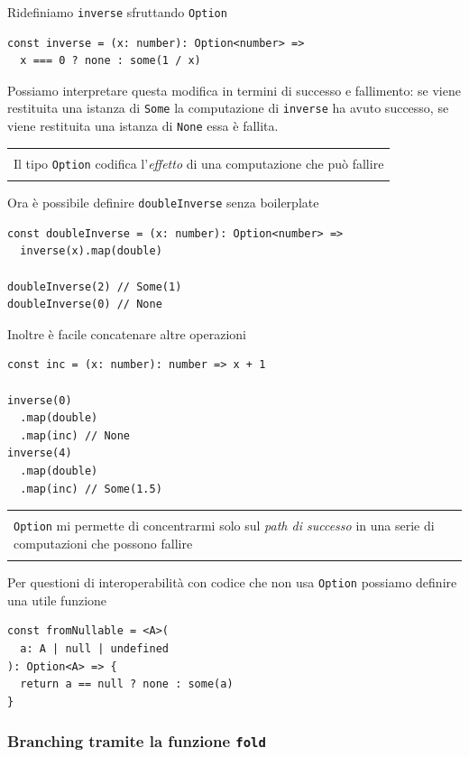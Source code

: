\documentclass[12pt]{article}
\newenvironment{boxed}
    {\begin{center}
    \begin{tabular}{|p{0.9\textwidth}|}
    \hline\\
    }
    {
    \\\\\hline
    \end{tabular}
    \end{center}
    }
\begin{document}
Ridefiniamo \texttt{inverse} sfruttando \texttt{Option}

\begin{verbatim}
const inverse = (x: number): Option<number> =>
  x === 0 ? none : some(1 / x)
\end{verbatim}

Possiamo interpretare questa modifica in termini di successo e fallimento: se viene restituita una istanza di \texttt{Some}
la computazione di \texttt{inverse} ha avuto successo, se viene restituita una istanza di \texttt{None} essa è fallita.

\begin{boxed}
Il tipo \texttt{Option} codifica l'\emph{effetto} di una computazione che può fallire
\end{boxed}

Ora è possibile definire \texttt{doubleInverse} senza boilerplate

\begin{verbatim}
const doubleInverse = (x: number): Option<number> =>
  inverse(x).map(double)

doubleInverse(2) // Some(1)
doubleInverse(0) // None
\end{verbatim}

Inoltre è facile concatenare altre operazioni

\begin{verbatim}
const inc = (x: number): number => x + 1

inverse(0)
  .map(double)
  .map(inc) // None
inverse(4)
  .map(double)
  .map(inc) // Some(1.5)
\end{verbatim}

\begin{boxed}
\texttt{Option} mi permette di concentrarmi solo sul \emph{path di successo} in una serie di computazioni che possono fallire
\end{boxed}

Per questioni di interoperabilità con codice che non usa \texttt{Option} possiamo definire una utile funzione

\begin{verbatim}
const fromNullable = <A>(
  a: A | null | undefined
): Option<A> => {
  return a == null ? none : some(a)
}
\end{verbatim}

\subsubsection{Branching tramite la funzione \texttt{fold}}
\end{document}
